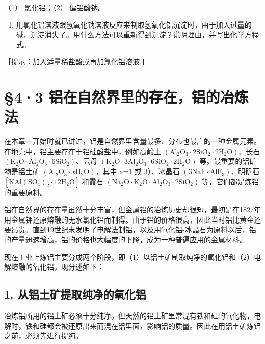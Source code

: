 （1） 氯化铝；（2） 偏铝酸钠。

\begin{enumerate}[start=8]
\item
  用氯化铝溶液跟氢氧化钠溶液反应来制取氢氧化铝沉淀时，由于加入过量的碱，沉淀消失了。用什么方法可以重新得到沉淀？说明理由，并写出化学方程式。
\end{enumerate}

［提示：加入适量稀盐酸或再加氯化铝溶液.］

\section{§4·3 铝在自然界里的存在，铝的冶炼法}

在本章一开始时就已讲过，铝是自然界里含量最多、分布也最广的一种金属元素。在地壳中，铝主要存在于铝硅酸盐中，例如高岭土
\(\left(\mathrm{Al}_{2}\mathrm{O}_{3}\cdot2\mathrm{SiO}_{2}\cdot2\mathrm{H}_{2}\mathrm{O}\right)\)、长石
\(\left(\mathrm{K}_{2}\mathrm{O}\cdot\mathrm{Al}_{2}\mathrm{O}_{3}\cdot6\mathrm{SiO}_{2}\right)\)、云母
\(\left(\mathrm{K}_{2}\mathrm{O}\cdot3\mathrm{Al}_{2}\mathrm{O}_{3}\cdot6\mathrm{SiO}_{2}\cdot2\mathrm{H}_{2}\mathrm{O}\right)\)
等。最重要的铝矿物是铝土矿
\(\left(\mathrm{Al}_{2}\mathrm{O}_{3}\cdot x\mathrm{H}_{2}\mathrm{O}\right)\)，其中
x=1 或 3）、冰晶石
\(\left(3\mathrm{NaF}\cdot\mathrm{AlF}_{3}\right)\)、明矾石
\(\left[\mathrm{KAl}\left(\mathrm{SO}_{4}\right)_{2}\cdot12\mathrm{H}_{2}\mathrm{O}\right]\)
和霞石
\(\left(\mathrm{Na}_{2}\mathrm{O}\cdot\mathrm{K}_{2}\mathrm{O}\cdot\mathrm{Al}_{2}\mathrm{O}_{3}\cdot2\mathrm{SiO}_{2}\right)\)
等，它们都是炼铝的重要原料。

铝在自然界的存在量虽然十分丰富，但金属铝的冶炼历史却很短，最初是在1827年用金属钾还原熔融的无水氯化铝而制得。由于铝的价格很高，因此当时铝比黄金还要昂贵。直到19世纪末发明了电解法制铝，以及用氧化铝-冰晶石为原料以后，铝的产量迅速增高，铝的价格也大幅度的下降，成为一种普遍应用的金属材料。

现在工业上炼铝主要分成两个阶段，即（1）以铝土矿制取纯净的氧化铝和（2）电解熔融的氧化铝。现分述如下：

\subsection{1. 从铝土矿提取纯净的氧化铝}

冶炼铝所用的铝土矿必须十分纯净。但天然的铝土矿里常混有铁和硅的氧化物，电解时，铁和硅都会被还原出来而混在铝里面，影响铝的质量。因此在用铝土矿炼铝之前，必须先进行提纯。

